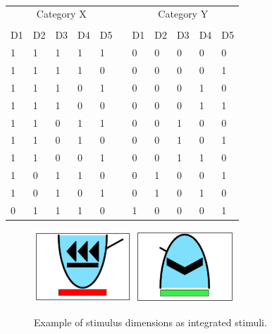 \documentclass[doc, a4paper, apacite]{apa6}
\begin{document}
\begin{table}[t]
	\centering
	\caption{}
	\label{table:abstractStructure}
	\begin{tabular}{lllllllllll}
		\toprule
		\multicolumn{5}{c}{Category X} &  & \multicolumn{5}{c}{Category Y} \\
		\cline{1-5} \cline{7-11} \\
		D1   & D2   & D3   & D4  & D5  &  & D1   & D2   & D3   & D4  & D5  \\
		\midrule
		1    & 1    & 1    & 1   & 1   &  & 0    & 0    & 0    & 0   & 0   \\
		1    & 1    & 1    & 1   & 0   &  & 0    & 0    & 0    & 0   & 1   \\
		1    & 1    & 1    & 0   & 1   &  & 0    & 0    & 0    & 1   & 0   \\
		1    & 1    & 1    & 0   & 0   &  & 0    & 0    & 0    & 1   & 1   \\
		1    & 1    & 0    & 1   & 1   &  & 0    & 0    & 1    & 0   & 0   \\
		1    & 1    & 0    & 1   & 0   &  & 0    & 0    & 1    & 0   & 1   \\
		1    & 1    & 0    & 0   & 1   &  & 0    & 0    & 1    & 1   & 0   \\
		1    & 0    & 1    & 1   & 0   &  & 0    & 1    & 0    & 0   & 1   \\
		1    & 0    & 1    & 0   & 1   &  & 0    & 1    & 0    & 1   & 0   \\
		0    & 1    & 1    & 1   & 0   &  & 1    & 0    & 0    & 0   & 1   \\
		\bottomrule
	\end{tabular}	
\end{table}

\begin{figure}[b]
	\centering
	\includegraphics[width=0.33\textwidth]{images/integratedStimulusExample}
	\includegraphics[width=0.33\textwidth]{images/integratedStimulusExample2}
	\caption{Example of stimulus dimensions as integrated stimuli.}
	\label{fig:integratedStimuli}
\end{figure}
\end{document}
